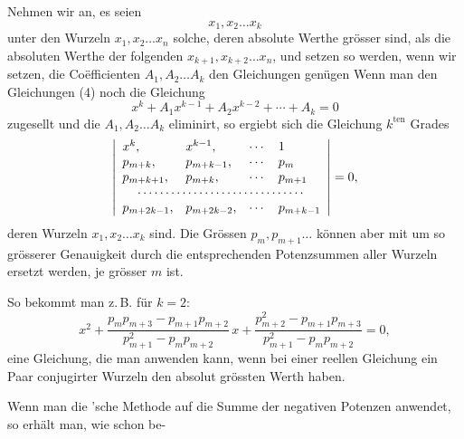 Nehmen wir an, es seien
\[
x_1, x_2 \ldots x_k
\]
unter den Wurzeln $x_1, x_2 \ldots x_n$ solche, deren absolute Werthe grösser sind, als die absoluten Werthe der folgenden $x_{k+1}, x_{k+2} \ldots x_n$, und setzen
so werden, wenn wir
setzen, die Coëfficienten $A_1, A_2 \ldots A_k$ den Gleichungen genügen
Wenn man den Gleichungen (4) noch die Gleichung
\[
x^k + A_1 x^{k-1} + A_2 x^{k-2} + \cdots + A_k = 0
\]
zugesellt und die $A_1, A_2 \ldots A_k$ eliminirt, so ergiebt sich die Gleichung $k^{\mathrm{ten}}$ Grades
\[
\left|
\begin{array}{llll}
x^k, & x^{k-1}, & \cdots & 1\\
p_{m+k}, & p_{m+k-1}, & \cdots & p_m\\
p_{m+k+1}, & p_{m+k}, & \cdots & p_{m+1}\\
\multicolumn{4}{c}{\cdots\cdots\cdots\cdots\cdots\cdots\cdots\cdots\cdots\cdots}\\
p_{m+2k-1}, & p_{m+2k-2}, & \cdots & p_{m+k-1}
\end{array}
\right| = 0,
\]
deren Wurzeln $x_1, x_2 \ldots x_k$ sind. Die Grössen $p_m, p_{m+1} \ldots$ können aber mit um so grösserer Genauigkeit durch die entsprechenden Potenzsummen aller Wurzeln ersetzt werden, je grösser $m$ ist.

So bekommt man z.\,B. für $k = 2$:
\[
x^2 + \frac{p_m p_{m+3} - p_{m+1}p_{m+2}}{p_{m+1}^2 - p_m p_{m+2}}\, x + \frac{p_{m+2}^2 - p_{m+1}p_{m+3}}{p_{m+1}^2 - p_m p_{m+2}} = 0,
\]
eine Gleichung, die man anwenden kann, wenn bei einer reellen Gleichung ein Paar conjugirter Wurzeln den absolut grössten Werth haben.

Wenn man die 'sche Methode auf die Summe der negativen Potenzen anwendet, so erhält man, wie schon be-
